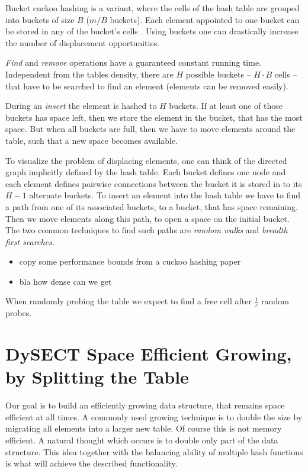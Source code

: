 \documentclass[a4paper,UKenglish]{lipics-v2016}
\begin{document}
Bucket cuckoo hashing is a variant, where the cells of the hash table
are grouped into buckets of size $B$ ($m/B$ buckets).  Each element
appointed to one bucket can be stored in any of the bucket's cells .
Using buckets one can drastically increase the number of displacement
opportunities.

\emph{Find} and \emph{remove} operations have a guaranteed constant
running time. Independent from the tables density, there are $H$
possible buckets -- $H\cdot B$ cells -- that have to be searched to
find an element (elements can be removed easily).

During an \emph{insert} the element is hashed to $H$ buckets.  If at least
one of those buckets has space left, then we store the element in the
bucket, that has the most space.  But when all buckets are full, then we
have to move elements around the table, such that a new space becomes
available.

\label{sec:cuckoo_graph}
To visualize the problem of displacing elements, one can think of the
directed graph implicitly defined by the hash table.  Each bucket
defines one node and each element defines pairwise connections between
the bucket it is stored in to its $H-1$ alternate buckets.  To insert
an element into the hash table we have to find a path from one of its
associated buckets, to a bucket, that has space remaining.  Then we
move elements along this path, to open a space on the initial bucket.
The two common techniques to find such paths are \emph{random walks} and
\emph{breadth first searches}.

\begin{itemize}
\item copy some performance bounds from a cuckoo hashing paper
\item bla how dense can we get
\end{itemize}

When randomly probing the table we expect to find a free cell after
$\frac{1}{\varepsilon}$ random probes.

\section{DySECT Space Efficient Growing, by Splitting the Table}
Our goal is to build an efficiently growing data structure, that
remains space efficient at all times.  A commonly used growing
technique is to double the size by migrating all elements
into a larger new table.  Of course this is
not memory efficient.  A natural thought which occurs is to double
only part of the data structure.  This idea together with the
balancing ability of multiple hash functions is what will achieve the
described functionality.
\end{document}
